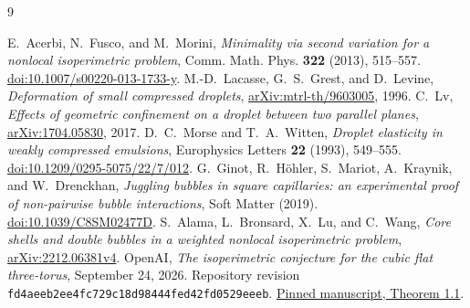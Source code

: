 \documentclass[11pt,reqno]{amsart}
\numberwithin{equation}{section}
\theoremstyle{definition}
\theoremstyle{remark}
\begin{document}
\enlargethispage{3\baselineskip}
\begin{thebibliography}{9}
\raggedright
{} E.~Acerbi, N.~Fusco, and M.~Morini,
\emph{Minimality via second variation for a nonlocal isoperimetric problem},
Comm. Math. Phys. \textbf{322} (2013), 515--557.
\href{https://doi.org/10.1007/s00220-013-1733-y}{doi:10.1007/s00220-013-1733-y}.
 M.-D.~Lacasse, G.~S.~Grest, and D.~Levine,
\emph{Deformation of small compressed droplets},
\href{https://arxiv.org/abs/mtrl-th/9603005}{arXiv:mtrl-th/9603005}, 1996.
 C.~Lv,
\emph{Effects of geometric confinement on a droplet between two parallel planes},
\href{https://arxiv.org/abs/1704.05830}{arXiv:1704.05830}, 2017.
 D.~C.~Morse and T.~A.~Witten,
\emph{Droplet elasticity in weakly compressed emulsions},
Europhysics Letters \textbf{22} (1993), 549--555.
\href{https://doi.org/10.1209/0295-5075/22/7/012}{doi:10.1209/0295-5075/22/7/012}.
 G.~Ginot, R.~H\"ohler, S.~Mariot, A.~Kraynik, and W.~Drenckhan,
\emph{Juggling bubbles in square capillaries: an experimental proof of
non-pairwise bubble interactions}, Soft Matter (2019).
\href{https://doi.org/10.1039/C8SM02477D}{doi:10.1039/C8SM02477D}.
 S.~Alama, L.~Bronsard, X.~Lu, and C.~Wang,
\emph{Core shells and double bubbles in a weighted nonlocal isoperimetric problem},
\href{https://arxiv.org/abs/2212.06381v4}{arXiv:2212.06381v4}.
 OpenAI,
\emph{The isoperimetric conjecture for the cubic flat three-torus},
September 24, 2026. Repository revision
\texttt{fd4aeeb2ee4fc729c18d98444fed42fd0529eeeb}.
\href{https://github.com/openai/math/blob/fd4aeeb2ee4fc729c18d98444fed42fd0529eeeb/preprints/The-Isoperimetric-Conjecture-for-the-Cubic-Flat-Three-Torus-September-24-2026/build/paper.tex}{Pinned manuscript, Theorem 1.1}.
\end{thebibliography}
\end{document}
